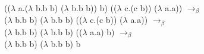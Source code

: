 \documentclass{article}
\begin{document}
\begin{flushleft}

(($\lambda$ a.($\lambda$ b.b b) ($\lambda$ b.b b)) b) (($\lambda$ c.(c b)) ($\lambda$ a.a)) $\rightarrow_\beta$ \\ 
($\lambda$ b.b b) ($\lambda$ b.b b) (($\lambda$ c.(c b)) ($\lambda$ a.a)) $\rightarrow_\beta$ \\ 
($\lambda$ b.b b) ($\lambda$ b.b b) (($\lambda$ a.a) b) $\rightarrow_\beta$ \\ 
($\lambda$ b.b b) ($\lambda$ b.b b) b

\end{flushleft}
\end{document}
